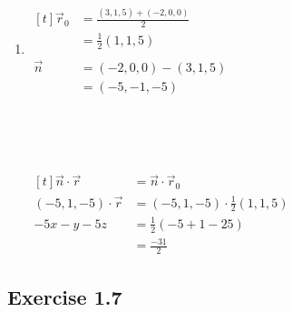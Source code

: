 \documentclass[11pt,fleqn]{book} %
\begin{document}
\begin{enumerate}
    {~~~}

    \item 
    $\begin{aligned}[t]
        \vec{r}_0 & = \frac{(3, 1, 5) + (-2, 0, 0)}{2} \\
                  & = \frac{1}{2} (1, 1, 5)
        \\ \\
        \vec{n}   & = (-2, 0, 0) - (3, 1, 5)           \\
                  & = (-5, -1, -5)
    \end{aligned}$

    {~~~}

    {~~~}

    $\begin{aligned}[t]
        \vec{n} \cdot \vec{r}     & = \vec{n} \cdot \vec{r}_0                \\
        (-5, 1, -5) \cdot \vec{r} & = (-5, 1, -5) \cdot \frac{1}{2}(1, 1, 5) \\
        -5x - y - 5z              & = \frac{1}{2}(-5 + 1 - 25)               \\
                                  & = \frac{-31}{2}
    \end{aligned}$
\end{enumerate}

\subsection*{Exercise 1.7}
\end{document}

